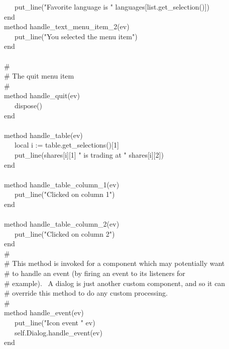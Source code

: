 {\>   \ \ \ put\_line("Favorite language is
" {\textbar}{\textbar} languages[list.get\_selection()]) \\
\>   end \\
\>   method handle\_text\_menu\_item\_2(ev) \\
\>   \ \ \ put\_line("You selected the menu
item") \\
\>   end \\
\ \\
\>   \# \\
\>   \# The quit menu item \\
\>   \# \\
\>   method handle\_quit(ev) \\
\>   \ \ \ dispose() \\
\>   end \\
\ \\
\>   method handle\_table(ev) \\
\>   \ \ \ local i := table.get\_selections()[1] \\
\>   \ \ \ put\_line(shares[i][1] {\textbar}{\textbar} "
is trading at " {\textbar}{\textbar} shares[i][2]) \\
\>   end \\
\ \\
\>   method handle\_table\_column\_1(ev) \\
\>   \ \ \ put\_line("Clicked on column
1") \\
\>   end \\
\ \\
\>   method handle\_table\_column\_2(ev) \\
\>   \ \ \ put\_line("Clicked on column
2") \\
\>   end
\ \\
\>   \# \\
\>   \# This method is invoked for a component which may potentially want \\
\>   \# to handle an event (by firing an event to its listeners for\\
\>   \# example). \ A dialog is just another custom component, and so it can\\
\>   \# override this method to do any custom processing. \\
\>   \# \\
\>   method handle\_event(ev) \\
\>   \ \ \ put\_line("Icon event "
{\textbar}{\textbar} ev) \\
\>   \ \ \ self.Dialog.handle\_event(ev) \\
\>   end \\
}

